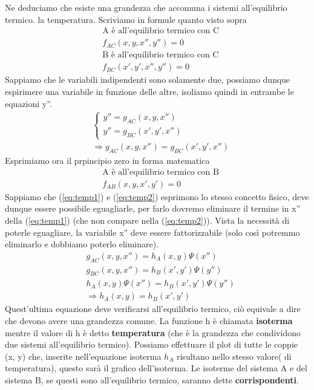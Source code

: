 \documentclass[10pt,a4paper]{article}
\begin{document}
Ne deduciamo che esiste una grandezza che accomuna i sistemi all'equilibrio termico. la temperatura. Scriviamo in formule quanto visto sopra
\begin{align*}
&\text{A è all'equilibrio termico con C}\\
&f_{AC}(x, y, x'', y'') = 0\\
&\text{B è all'equilibrio termico con C}\\
&f_{BC}(x', y', x'', y'') = 0
\end{align*}
Sappiamo che le variabili indipendenti sono solamente due, possiamo dunque espirimere una variabile in funzione delle altre, isoliamo quindi in entrambe le equazioni y''. 
\begin{align}\label{eq:temp1}
&\begin{cases}
	y'' = g_{AC}(x, y, x'')\\
	y'' = g_{BC}(x', y', x'')
\end{cases}\\\nonumber
&\Rightarrow g_{AC}(x, y, x'')=  g_{BC}(x', y', x'')
\end{align}
Esprimiamo ora il prpincipio zero in forma matematica
\begin{align}\label{eq:temp2}
&\text{A è all'equilibrio termico con B}\\ \nonumber
&f_{AB}(x,y, x', y') = 0
\end{align}
Sappiamo che (\ref{eq:temp1}) e (\ref{eq:temp2}) esprimono lo stesso concetto fisico, deve dunque essere possibile eguagliarle, per farlo dovremo eliminare il termine in x'' della (\ref{eq:temp1}) (che non compare nella (\ref{eq:temp2})). Vista la necessità di poterle eguagliare, la variabile x''  deve essere fattorizzabile (solo così potremmo eliminarlo e dobbiamo poterlo eliminare).
\begin{align*}
	&g_{AC}(x, y, x'')=h_A(x, y) \Psi(x'') \\
	&g_{BC}(x, y, x'')=h_B(x', y') \Psi(y'')\\
	&h_A(x, y) \Psi(x'')=h_B(x', y') \Psi(y'')\\
	&\Rightarrow h_A(x, y) = h_B(x', y')
\end{align*}
Quest'ultima equazione deve verificarsi all'equilibrio termico, ciò equivale a dire che devono avere una grandezza comune. La funzione h è chiamata \textbf{isoterma} mentre il valore di h è detto \textbf{temperatura} (che è la grandezza che condividono due sistemi all'equilibrio termico). Possiamo effettuare il plot di tutte le coppie (x, y) che, inserite nell'equazione isoterma $h_A$ risultano nello stesso valore( di temperatura), questo sarà il grafico dell'isoterma. Le isoterme del sistema A e del sistema B, se questi sono all'equilibrio termico, saranno dette \textbf{corrispondenti}. 
\end{document}
